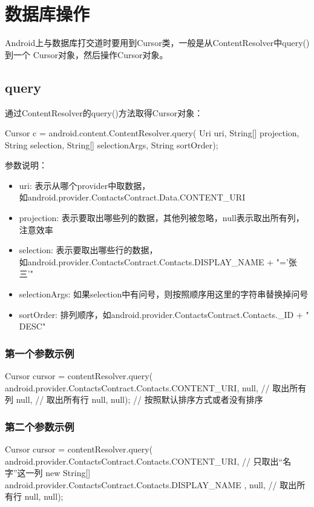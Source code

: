 
\section[数据库操作]{数据库操作}
Android上与数据库打交道时要用到Cursor类，一般是从ContentResolver中query()到一个
Cursor对象，然后操作Cursor对象。

\subsection[query]{query}
通过ContentResolver的query()方法取得Cursor对象：

\begin{javacode}
Cursor c = android.content.ContentResolver.query(
    Uri uri,
    String[] projection,
    String selection,
    String[] selectionArgs,
    String sortOrder);
\end{javacode}

参数说明：

\begin{itemize}
\item uri: 表示从哪个provider中取数据，\\如android.provider.ContactsContract.Data.CONTENT\_URI
\item projection: 表示要取出哪些列的数据，其他列被忽略，null表示取出所有列，注意效率
\item selection: 表示要取出哪些行的数据，\\如android.provider.ContactsContract.Contacts.DISPLAY\_NAME + "='张三'"
\item selectionArgs: 如果selection中有问号，则按照顺序用这里的字符串替换掉问号
\item sortOrder: 排列顺序，如android.provider.ContactsContract.Contacts.\_ID + " DESC"
\end{itemize}

\subsubsection[第一个参数示例]{第一个参数示例}
\begin{javacode}
Cursor cursor = contentResolver.query(
    android.provider.ContactsContract.Contacts.CONTENT_URI,
    null, // 取出所有列
    null, // 取出所有行
    null,
    null); // 按照默认排序方式或者没有排序
\end{javacode}

\subsubsection[第二个参数示例]{第二个参数示例}
\begin{javacode}
Cursor cursor = contentResolver.query(
    android.provider.ContactsContract.Contacts.CONTENT_URI,
    // 只取出“名字”这一列
    new String[]{ android.provider.ContactsContract.Contacts.DISPLAY_NAME },
    null, // 取出所有行
    null,
    null);
\end{javacode}

